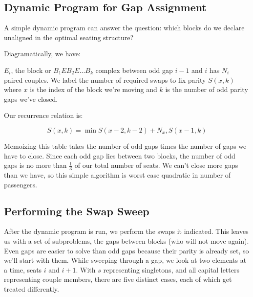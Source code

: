 \subsection{Dynamic Program for Gap Assignment}

A simple dynamic program can answer the question: which blocks do we declare unaligned in the optimal seating structure?  

Diagramatically, we have:

\begin{figure}[H]
\centering
{}
\end{figure}

$E_i$, the block or $B_1EB_2E...B_k$ complex between odd gap $i-1$ and $i$ has $N_i$ paired couples.  We label the number of required swaps to fix parity $S(x,k)$ where $x$ is the index of the block we're moving and $k$ is the number of odd parity gaps we've closed.

Our recurrence relation is: 

\begin{equation*}
  S(x,k) = \min S(x-2, k-2) + N_{x}, S(x-1,k)
\end{equation*}

Memoizing this table takes the number of odd gaps times the number of gaps we have to close.  Since each odd gap lies between two blocks, the number of odd gaps is no more than $\frac13$ of our total number of seats.  We can't close more gaps than we have, so this simple algorithm is worst case quadratic in number of passengers.  

\subsection{Performing the Swap Sweep}

After the dynamic program is run, we perform the swaps it indicated.  This leaves us with a set of subproblems, the gaps between blocks (who will not move again).  Even gaps are easier to solve than odd gaps because their parity is already set, so we'll start with them.  While sweeping through a gap, we look at two elements at a time, seats $i$ and $i+1$.  With $s$ representing singletons, and all capital letters representing couple members, there are five distinct cases, each of which get treated differently.

